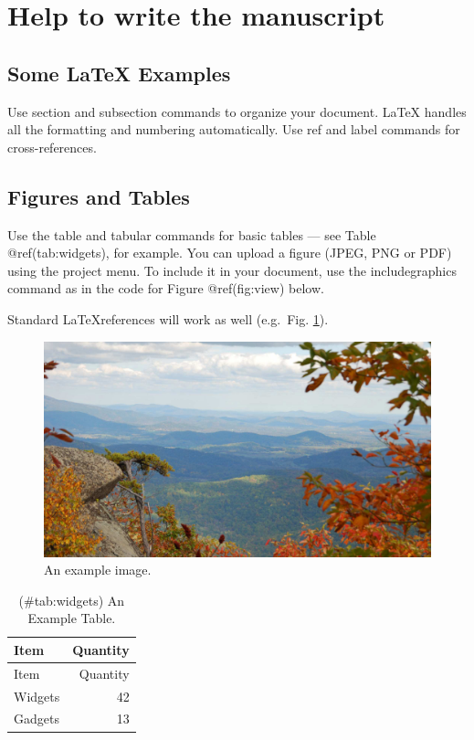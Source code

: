 \documentclass[fleqn,10pt,lineno]{wlpeerj} %
\begin{document}
\section*{Help to write the
manuscript}\label{help-to-write-the-manuscript}

\subsection*{\texorpdfstring{Some \LaTeX{}
Examples}{Some  Examples}}\label{some-examples}

Use section and subsection commands to organize your document. \LaTeX{}
handles all the formatting and numbering automatically. Use ref and
label commands for cross-references.

\subsection*{Figures and Tables}\label{figures-and-tables}

Use the table and tabular commands for basic tables --- see Table
@ref(tab:widgets), for example. You can upload a figure (JPEG, PNG or
PDF) using the project menu. To include it in your document, use the
includegraphics command as in the code for Figure @ref(fig:view) below.

Standard \LaTeX references will work as well (e.g.~Fig. \ref{fig:view}).

\begin{figure}
\includegraphics[width=1\linewidth]{view} \caption{An example image.}\label{fig:view}
\end{figure}

\begin{longtable}[]{@{}lr@{}}
\caption{(\#tab:widgets) An Example Table.}\tabularnewline
\toprule
Item & Quantity\tabularnewline
\midrule
\endfirsthead
\toprule
Item & Quantity\tabularnewline
\midrule
\endhead
Widgets & 42\tabularnewline
Gadgets & 13\tabularnewline
\bottomrule
\end{longtable}
\end{document}

